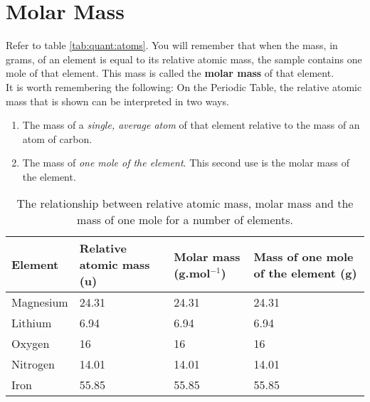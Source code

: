 



\section{Molar Mass}
\label{subsec:quant:mm}


Refer to table \ref{tab:quant:atoms}. You will remember that when the mass, in grams, of an element is equal to its relative atomic mass, the sample contains one mole of that element. This mass is called the \textbf{molar mass} of that element.\\

It is worth remembering the following: On the Periodic Table, the relative atomic mass that is shown can be interpreted in two ways.

\begin{enumerate} 
\item{The mass of a \textit{single, average atom} of that element relative to the mass of an atom of carbon.}
\item{The mass of \textit{one mole of the element}. This second use is the molar mass of the element.}
\end{enumerate}

\begin{table}[h]
\caption{The relationship between relative atomic mass, molar mass and the mass of one mole for a number of elements.}
\label{tab:mole summary}
\begin{center}
\begin{tabular}{|p{2cm}|p{2cm}|p{2cm}|p{2cm}|}\hline
\textbf{Element} & \textbf{Relative atomic mass (u)} & \textbf{Molar mass (g.mol$^{-1}$)} & \textbf{Mass of one mole of the element (g)} \\\hline
Magnesium & 24.31 & 24.31 & 24.31 \\\hline
Lithium & 6.94 & 6.94 & 6.94 \\\hline
Oxygen & 16 & 16 & 16 \\\hline
Nitrogen & 14.01 & 14.01 & 14.01 \\\hline
Iron & 55.85 & 55.85 & 55.85 \\\hline
\end{tabular}
\end{center}
\end{table}

